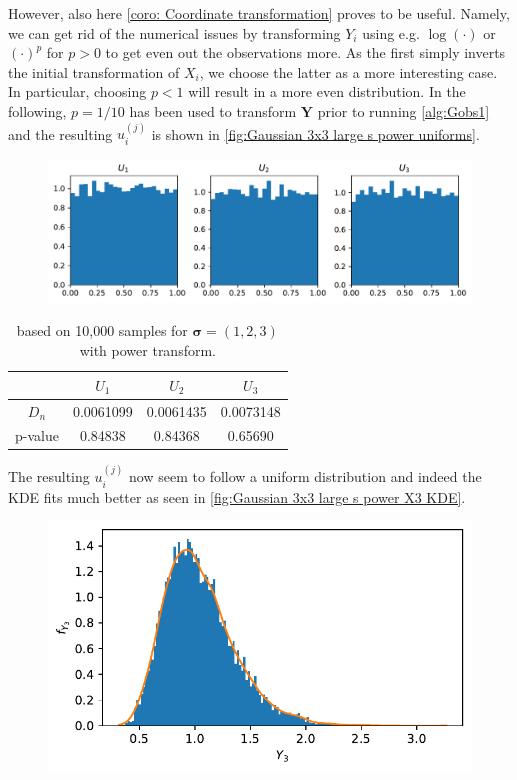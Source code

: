 \documentclass[../Thesis.tex]{subfiles}
\begin{document}
\begin{example}
    However, also here \autoref{coro: Coordinate transformation} proves to be useful. Namely, we can get rid of the numerical issues by transforming $Y_i$ using e.g. $\log(\cdot)$ or $(\cdot)^{p}$ for $p>0$ to get even out the observations more. As the first simply inverts the initial transformation of $X_i$, we choose the latter as a more interesting case. In particular, choosing $p<1$ will result in a more even distribution. In the following, $p=1/10$ has been used to transform $\boldsymbol Y$ prior to running \autoref{alg:Gobs1} and the resulting $u_i^{(j)}$ is shown in \autoref{fig:Gaussian 3x3 large s power uniforms}.
    \begin{figure}[H]
        \centering
        \includegraphics[width=0.99\linewidth]{figures/ND examples/Gaussian 3x3 large s power uniforms.pdf}
        \caption{}
        \label{fig:Gaussian 3x3 large s power uniforms}
    \end{figure}
    \begin{table}[h]
        \centering
        \begin{tabular}{c|c|c|c}
                    & $U_1$     & $U_2$     & $U_3$     \\\hline
            $D_n$   & 0.0061099 & 0.0061435 & 0.0073148 \\
            p-value & 0.84838   & 0.84368   & 0.65690
        \end{tabular}
        \caption{based on 10,000 samples for $\boldsymbol\sigma = (1, 2, 3)$ with power transform.}
    \end{table}
    The resulting $u_i^{(j)}$ now seem to follow a uniform distribution and indeed the KDE fits much better as seen in \autoref{fig:Gaussian 3x3 large s power X3 KDE}.
    \begin{figure}[H]
        \centering
        \includegraphics[width=0.7\linewidth]{figures/ND examples/Gaussian 3x3 large s power X3 KDE.pdf}

\end{figure}
\end{example}
\end{document}
